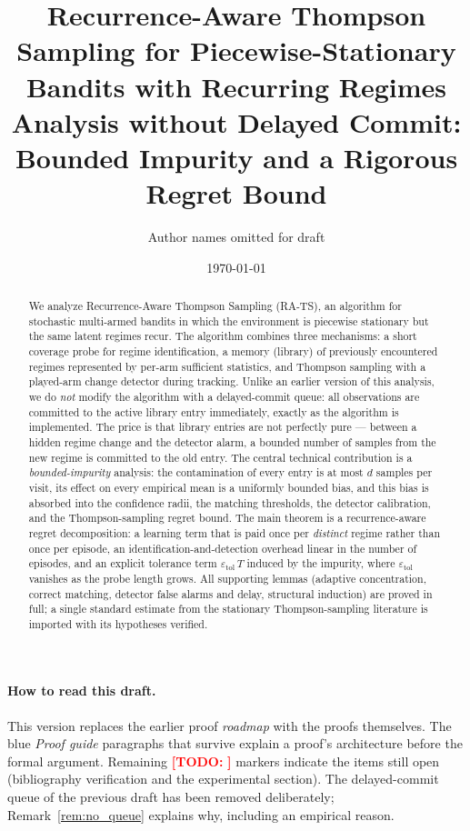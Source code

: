 \documentclass[11pt]{article}
\title{Recurrence-Aware Thompson Sampling for Piecewise-Stationary Bandits with Recurring Regimes\\
\large Analysis without Delayed Commit: Bounded Impurity and a Rigorous Regret Bound}
\author{Author names omitted for draft}
\date{\today}
\newcommand{\etol}{\varepsilon_{\mathrm{tol}}}
\newcommand{\todo}[1]{\textcolor{red}{\textbf{[TODO:} #1\textbf{]}}}
\begin{document}
\maketitle

\begin{abstract}
We analyze Recurrence-Aware Thompson Sampling (RA-TS), an algorithm for stochastic multi-armed bandits in which the environment is piecewise stationary but the same latent regimes recur. The algorithm combines three mechanisms: a short coverage probe for regime identification, a memory (library) of previously encountered regimes represented by per-arm sufficient statistics, and Thompson sampling with a played-arm change detector during tracking. Unlike an earlier version of this analysis, we do \emph{not} modify the algorithm with a delayed-commit queue: all observations are committed to the active library entry immediately, exactly as the algorithm is implemented. The price is that library entries are not perfectly pure --- between a hidden regime change and the detector alarm, a bounded number of samples from the new regime is committed to the old entry. The central technical contribution is a \emph{bounded-impurity} analysis: the contamination of every entry is at most $d$ samples per visit, its effect on every empirical mean is a uniformly bounded bias, and this bias is absorbed into the confidence radii, the matching thresholds, the detector calibration, and the Thompson-sampling regret bound. The main theorem is a recurrence-aware regret decomposition: a learning term that is paid once per \emph{distinct} regime rather than once per episode, an identification-and-detection overhead linear in the number of episodes, and an explicit tolerance term $\etol\, T$ induced by the impurity, where $\etol$ vanishes as the probe length grows. All supporting lemmas (adaptive concentration, correct matching, detector false alarms and delay, structural induction) are proved in full; a single standard estimate from the stationary Thompson-sampling literature is imported with its hypotheses verified.
\end{abstract}

\paragraph{How to read this draft.}
This version replaces the earlier proof \emph{roadmap} with the proofs themselves. The blue \emph{Proof guide} paragraphs that survive explain a proof's architecture before the formal argument. Remaining \todo{} markers indicate the items still open (bibliography verification and the experimental section). The delayed-commit queue of the previous draft has been removed deliberately; Remark~\ref{rem:no_queue} explains why, including an empirical reason.
\end{document}
